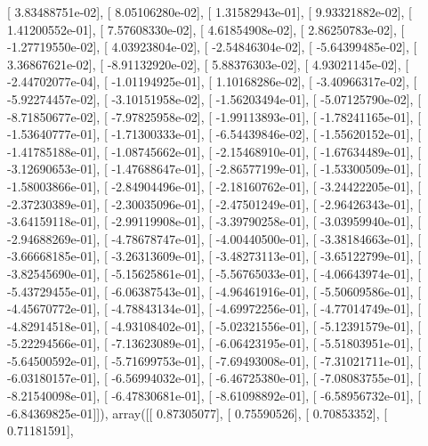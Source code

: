 \documentclass{article}
\begin{document}
       [  3.83488751e-02],
       [  8.05106280e-02],
       [  1.31582943e-01],
       [  9.93321882e-02],
       [  1.41200552e-01],
       [  7.57608330e-02],
       [  4.61854908e-02],
       [  2.86250783e-02],
       [ -1.27719550e-02],
       [  4.03923804e-02],
       [ -2.54846304e-02],
       [ -5.64399485e-02],
       [  3.36867621e-02],
       [ -8.91132920e-02],
       [  5.88376303e-02],
       [  4.93021145e-02],
       [ -2.44702077e-04],
       [ -1.01194925e-01],
       [  1.10168286e-02],
       [ -3.40966317e-02],
       [ -5.92274457e-02],
       [ -3.10151958e-02],
       [ -1.56203494e-01],
       [ -5.07125790e-02],
       [ -8.71850677e-02],
       [ -7.97825958e-02],
       [ -1.99113893e-01],
       [ -1.78241165e-01],
       [ -1.53640777e-01],
       [ -1.71300333e-01],
       [ -6.54439846e-02],
       [ -1.55620152e-01],
       [ -1.41785188e-01],
       [ -1.08745662e-01],
       [ -2.15468910e-01],
       [ -1.67634489e-01],
       [ -3.12690653e-01],
       [ -1.47688647e-01],
       [ -2.86577199e-01],
       [ -1.53300509e-01],
       [ -1.58003866e-01],
       [ -2.84904496e-01],
       [ -2.18160762e-01],
       [ -3.24422205e-01],
       [ -2.37230389e-01],
       [ -2.30035096e-01],
       [ -2.47501249e-01],
       [ -2.96426343e-01],
       [ -3.64159118e-01],
       [ -2.99119908e-01],
       [ -3.39790258e-01],
       [ -3.03959940e-01],
       [ -2.94688269e-01],
       [ -4.78678747e-01],
       [ -4.00440500e-01],
       [ -3.38184663e-01],
       [ -3.66668185e-01],
       [ -3.26313609e-01],
       [ -3.48273113e-01],
       [ -3.65122799e-01],
       [ -3.82545690e-01],
       [ -5.15625861e-01],
       [ -5.56765033e-01],
       [ -4.06643974e-01],
       [ -5.43729455e-01],
       [ -6.06387543e-01],
       [ -4.96461916e-01],
       [ -5.50609586e-01],
       [ -4.45670772e-01],
       [ -4.78843134e-01],
       [ -4.69972256e-01],
       [ -4.77014749e-01],
       [ -4.82914518e-01],
       [ -4.93108402e-01],
       [ -5.02321556e-01],
       [ -5.12391579e-01],
       [ -5.22294566e-01],
       [ -7.13623089e-01],
       [ -6.06423195e-01],
       [ -5.51803951e-01],
       [ -5.64500592e-01],
       [ -5.71699753e-01],
       [ -7.69493008e-01],
       [ -7.31021711e-01],
       [ -6.03180157e-01],
       [ -6.56994032e-01],
       [ -6.46725380e-01],
       [ -7.08083755e-01],
       [ -8.21540098e-01],
       [ -6.47830681e-01],
       [ -8.61098892e-01],
       [ -6.58956732e-01],
       [ -6.84369825e-01]]), array([[ 0.87305077],
       [ 0.75590526],
       [ 0.70853352],
       [ 0.71181591],
\end{document}

